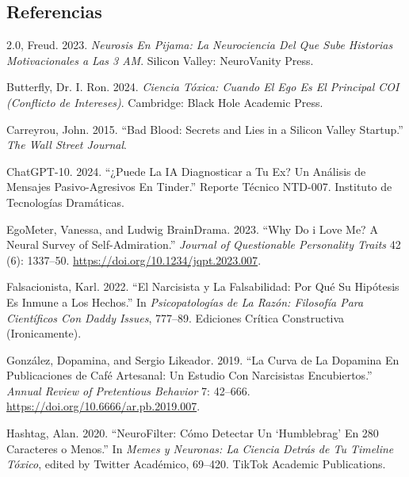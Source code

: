 \documentclass[
]{article}
\newlength{\cslhangindent}
\newenvironment{CSLReferences}[2] %
 {\begin{list}{}{%
  \setlength{\itemindent}{0pt}
  \setlength{\leftmargin}{0pt}
  \setlength{\parsep}{0pt}
  \ifodd #1
   \setlength{\leftmargin}{\cslhangindent}
   \setlength{\itemindent}{-1\cslhangindent}
  \fi
  \setlength{\itemsep}{#2\baselineskip}}}
 {\end{list}}
\begin{document}
\subsection*{Referencias}\label{referencias}

\label{refs}
\begin{CSLReferences}{1}{0}
2.0, Freud. 2023. \emph{Neurosis En Pijama: La Neurociencia Del Que Sube
Historias Motivacionales a Las 3 AM}. Silicon Valley: NeuroVanity Press.

Butterfly, Dr. I. Ron. 2024. \emph{Ciencia Tóxica: Cuando El Ego Es El
Principal {COI} (Conflicto de Intereses)}. Cambridge: Black Hole
Academic Press.

Carreyrou, John. 2015. {``Bad Blood: Secrets and Lies in a Silicon
Valley Startup.''} \emph{The Wall Street Journal}.

ChatGPT-10. 2024. {``¿Puede La {IA} Diagnosticar a Tu Ex? Un Análisis de
Mensajes Pasivo-Agresivos En Tinder.''} Reporte Técnico NTD-007.
Instituto de Tecnologías Dramáticas.

EgoMeter, Vanessa, and Ludwig BrainDrama. 2023. {``Why Do i Love Me? A
Neural Survey of Self-Admiration.''} \emph{Journal of Questionable
Personality Traits} 42 (6): 1337--50.
\url{https://doi.org/10.1234/jqpt.2023.007}.

Falsacionista, Karl. 2022. {``El Narcisista y La Falsabilidad: Por Qué
Su Hipótesis Es Inmune a Los Hechos.''} In \emph{Psicopatologías de La
Razón: Filosofía Para Científicos Con Daddy Issues}, 777--89. Ediciones
Crítica Constructiva (Ironicamente).

González, Dopamina, and Sergio Likeador. 2019. {``La Curva de La
Dopamina En Publicaciones de Café Artesanal: Un Estudio Con Narcisistas
Encubiertos.''} \emph{Annual Review of Pretentious Behavior} 7: 42--666.
\url{https://doi.org/10.6666/ar.pb.2019.007}.

Hashtag, Alan. 2020. {``NeuroFilter: Cómo Detectar Un {{`Humblebrag'}}
En 280 Caracteres o Menos.''} In \emph{Memes y Neuronas: La Ciencia
Detrás de Tu Timeline Tóxico}, edited by Twitter Académico, 69--420.
TikTok Academic Publications.


\end{CSLReferences}
\end{document}
